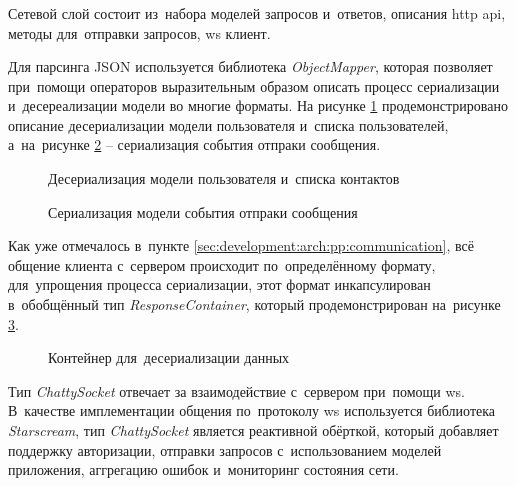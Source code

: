 \subsubsection{}
\label{sec:development:client:networking}

Сетевой слой состоит из~набора моделей запросов и~ответов, описания \gls{http} \gls{api}, методы для~отправки запросов, \gls{ws} клиент.

Для парсинга JSON используется библиотека \textit{ObjectMapper}, которая позволяет при~помощи операторов выразительным образом описать процесс сериализации и~десереализации модели во многие форматы.
На рисунке \ref{sec:development:client:networking:code:deserialize} продемонстрировано описание десериализации модели пользователя и~списка пользователей, а~на~рисунке \ref{sec:development:client:networking:code:serialize} -- сериализация события отпраки сообщения.

\begin{figure}[h]
	
   \caption{Десериализация модели пользователя и~списка контактов}
   \label{sec:development:client:networking:code:deserialize}
\end{figure}

\begin{figure}[h]
	
   \caption{Сериализация модели события отпраки сообщения}
   \label{sec:development:client:networking:code:serialize}
\end{figure}

Как уже отмечалось в~пункте \ref{sec:development:arch:pp:communication}, всё общение клиента с~сервером происходит по~определённому формату, для~упрощения процесса сериализации, этот формат инкапсулирован в~обобщённый тип \textit{ResponseContainer}, который продемонстрирован на~рисунке \ref{sec:development:client:networking:code:deserialize:container}.

\begin{figure}[h]
	
   \caption{Контейнер для~десериализации данных}
   \label{sec:development:client:networking:code:deserialize:container}
\end{figure}

Тип \textit{ChattySocket} отвечает за взаимодействие с~сервером при~помощи \gls{ws}. В~качестве имплементации общения по~протоколу \gls{ws} используется библиотека \textit{Starscream}, тип \textit{ChattySocket} является реактивной обёрткой, который добавляет поддержку авторизации, отправки запросов с~использованием моделей приложения, аггрегацию ошибок и~мониторинг состояния сети.

